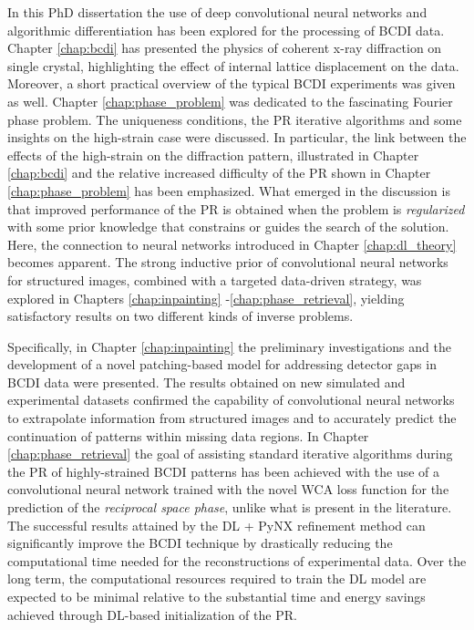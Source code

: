 In this PhD dissertation the use of deep convolutional neural networks and algorithmic differentiation has been 
explored for the processing of BCDI data. Chapter \ref{chap:bcdi} has presented the physics of coherent x-ray diffraction 
on single crystal, highlighting the effect of internal lattice displacement on the data. Moreover, a short practical 
overview of the typical BCDI experiments was given as well. Chapter \ref{chap:phase_problem} was dedicated to the fascinating 
Fourier phase problem. The uniqueness conditions, the PR iterative algorithms and some insights on the 
high-strain case were discussed. In particular, the link between the effects of the high-strain on the diffraction pattern, illustrated 
in Chapter \ref{chap:bcdi} and the relative increased difficulty of the PR shown in Chapter \ref{chap:phase_problem} has 
been emphasized. What emerged in the discussion is that improved performance of the PR is obtained when the problem is 
\textit{regularized} with some prior knowledge that constrains or guides the search of the solution. Here, the connection 
to neural networks introduced in Chapter \ref{chap:dl_theory} becomes apparent. The strong inductive prior of convolutional 
neural networks for structured images, combined with a targeted data-driven strategy, was explored in Chapters \ref{chap:inpainting}
-\ref{chap:phase_retrieval}, yielding satisfactory results on two different kinds of inverse problems. 


Specifically, 
in Chapter \ref{chap:inpainting} the preliminary 
investigations and the development of a novel patching-based model for addressing detector gaps in BCDI data were presented. 
The results obtained on new simulated and experimental datasets confirmed the capability of convolutional neural networks 
to extrapolate information from structured images and to accurately predict the continuation of patterns within missing 
data regions. 
In Chapter \ref{chap:phase_retrieval} the goal of assisting standard iterative algorithms during the PR 
of highly-strained BCDI patterns has been achieved with the use of a convolutional neural network trained with the novel 
WCA loss function for the prediction of the \textit{reciprocal space phase}, unlike what is present in the literature. 
The successful results attained by the DL + PyNX refinement method can significantly improve the BCDI technique by 
drastically reducing the computational time needed for the reconstructions of experimental data. Over the long term, 
the computational resources required to train the DL model are expected to be minimal relative to the substantial 
time and energy savings achieved through DL-based initialization of the PR.

